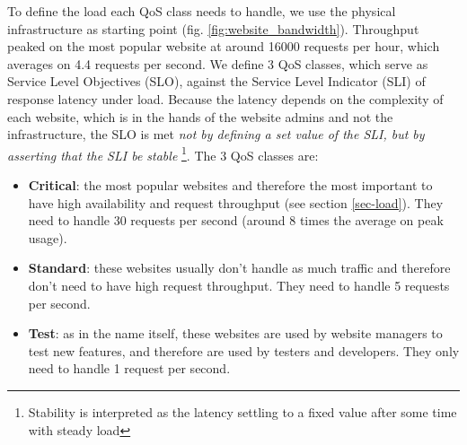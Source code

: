 To define the load each QoS class needs to handle, we use the physical infrastructure as starting point (fig. \ref{fig:website_bandwidth}).
Throughput peaked on the most popular website at around 16000 requests per hour, which averages on 4.4 requests per second.
We define 3 QoS classes, which serve as Service Level Objectives (SLO), against the Service Level Indicator (SLI) of response latency under load.
Because the latency depends on the complexity of each website, which is in the hands of the website admins and not the infrastructure,
the SLO is met \emph{not by defining a set value of the SLI, but by asserting that the SLI be stable}
\footnote{Stability is interpreted as the latency settling to a fixed value after some time with steady load}.
The 3 QoS classes are:

\begin{itemize}
    \item \textbf{Critical}: the most popular websites and therefore the most important to have high availability and request throughput (see section \ref{sec-load}).
    They need to handle 30 requests per second (around 8 times the average on peak usage).
    \item \textbf{Standard}: these websites usually don't handle as much traffic and therefore don't need to have high request throughput.
    They need to handle 5 requests per second. 
    \item \textbf{Test}: as in the name itself, these websites are used by website managers to test new features, and therefore are used by testers and developers.
    They only need to handle 1 request per second.
\end{itemize}




